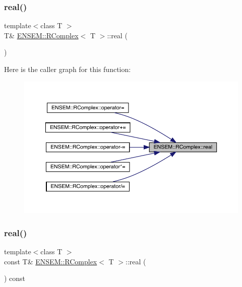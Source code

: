 \mbox{\label{classENSEM_1_1RComplex_a1675e3defa774edeb1a7390bd14a86c8}} 
\subsubsection{\texorpdfstring{real()}{real()}\hspace{0.1cm}{\footnotesize\ttfamily [3/6]}}
{\footnotesize\ttfamily template$<$class T $>$ \\
T\& \mbox{\hyperlink{classENSEM_1_1RComplex}{E\+N\+S\+E\+M\+::\+R\+Complex}}$<$ T $>$\+::real (\begin{DoxyParamCaption}{ }\end{DoxyParamCaption})\hspace{0.3cm}{\ttfamily [inline]}}

Here is the caller graph for this function\+:
\nopagebreak
\begin{figure}[H]
\begin{center}
\leavevmode
\includegraphics[width=350pt]{d9/d0e/classENSEM_1_1RComplex_a1675e3defa774edeb1a7390bd14a86c8_icgraph}
\end{center}
\end{figure}
\mbox{\label{classENSEM_1_1RComplex_a0a055b8b16ef4c73ab5fb4e5ff93c7f1}} 
\subsubsection{\texorpdfstring{real()}{real()}\hspace{0.1cm}{\footnotesize\ttfamily [4/6]}}
{\footnotesize\ttfamily template$<$class T $>$ \\
const T\& \mbox{\hyperlink{classENSEM_1_1RComplex}{E\+N\+S\+E\+M\+::\+R\+Complex}}$<$ T $>$\+::real (\begin{DoxyParamCaption}{ }\end{DoxyParamCaption}) const\hspace{0.3cm}{\ttfamily [inline]}}


